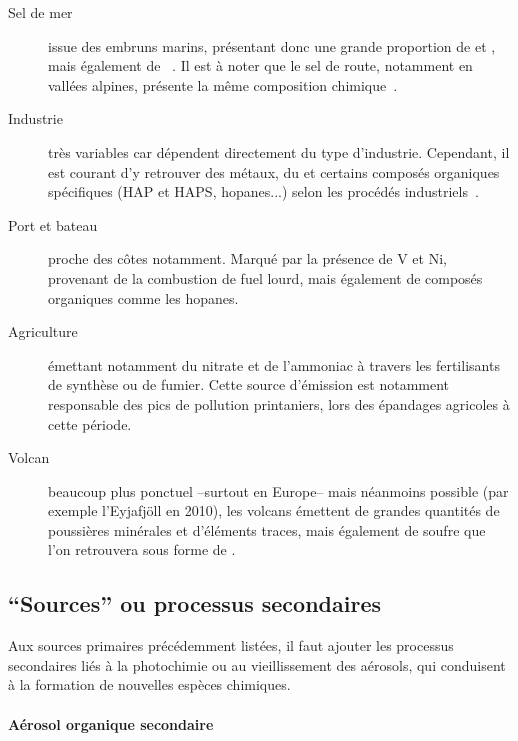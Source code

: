 \begin{description}
    \item[Sel de mer] issue des embruns marins, présentant donc une grande proportion de
         et , mais également de
        ~\autocite{belisCritical2013,odowdMarine1997,pioClimatology2007}. Il
        est à noter que le sel de route, notamment en vallées alpines, présente la même
        composition chimique~\autocite{airrhone-alpesInfluence2012}.

    \item[Industrie] très variables car dépendent directement du type d'industrie.
        Cependant, il est courant d'y retrouver des métaux, du \SOq et certains composés
        organiques spécifiques (HAP et HAPS, hopanes...) selon les procédés
        industriels~\autocite{elhaddadPrimary2011,sylvestreComprehensive2017}.

    \item[Port et bateau] proche des côtes notamment. Marqué par la présence de V et Ni,
        provenant de la combustion de fuel lourd, mais également de composés organiques
        comme les hopanes.

    \item[Agriculture] émettant notamment du nitrate et de l'ammoniac à travers les
        fertilisants de synthèse ou de fumier. Cette source d'émission est notamment
        responsable des pics de pollution printaniers, lors des épandages agricoles à cette
        période.

    \item[Volcan] beaucoup plus ponctuel --surtout en Europe-- mais néanmoins possible
        (par exemple l'Eyjafjöll en 2010), les volcans émettent de grandes quantités de
        poussières minérales et d'éléments traces, mais également de soufre que l'on
        retrouvera sous forme de \SOq.

\end{description}

\subsection{``Sources'' ou processus secondaires}%
\label{sub:_sources_secondaires}

Aux sources primaires précédemment listées, il faut ajouter les processus secondaires liés
à la photochimie ou au vieillissement des aérosols, qui conduisent à la formation de
nouvelles espèces chimiques.

\paragraph{Aérosol organique secondaire}%
\label{par:aérosol_organique_secondaire}

